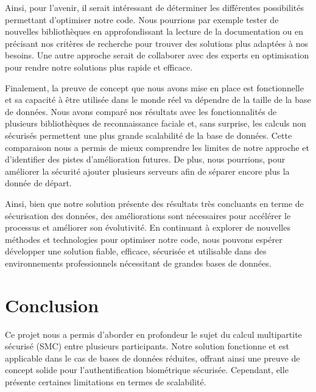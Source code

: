 \documentclass[12pt,a4paper]{article}
\begin{document}
Ainsi, pour l'avenir, il serait intéressant de déterminer les différentes possibilités permettant d'optimiser notre code. Nous pourrions par exemple tester de nouvelles bibliothèques en approfondissant la lecture de la documentation ou en précisant nos critères de recherche pour trouver des solutions plus adaptées à nos besoins. Une autre approche serait de collaborer avec des experts en optimisation pour rendre notre solutions plus rapide et efficace.

Finalement, la preuve de concept que nous avons mise en place est fonctionnelle et sa capacité à être utilisée dans le monde réel va dépendre de la taille de la base de données. Nous avons comparé nos résultats avec les fonctionnalités de plusieurs bibliothèques de reconnaissance faciale et, sans surprise, les calculs non sécurisés permettent une plus grande scalabilité de la base de données. Cette comparaison nous a permis de mieux comprendre les limites de notre approche et d'identifier des pistes d'amélioration futures. De plus, nous pourrions, pour améliorer la sécurité ajouter plusieurs serveurs afin de séparer encore plus la donnée de départ.

Ainsi, bien que notre solution présente des résultats très concluants en terme de sécurisation des données, des améliorations sont nécessaires pour accélérer le processus et améliorer son évolutivité. En continuant à explorer de nouvelles méthodes et technologies pour optimiser notre code, nous pouvons espérer développer une solution fiable, efficace, sécurisée et utilisable dans des environnements professionnels nécessitant de grandes bases de données.



\newpage
\section{Conclusion}
Ce projet nous a permis d'aborder en profondeur le sujet du calcul multipartite sécurisé (SMC) entre plusieurs participants. Notre solution fonctionne et est applicable dans le cas de bases de données réduites, offrant ainsi une preuve de concept solide pour l'authentification biométrique sécurisée. Cependant, elle présente certaines limitations en termes de scalabilité.
\end{document}
